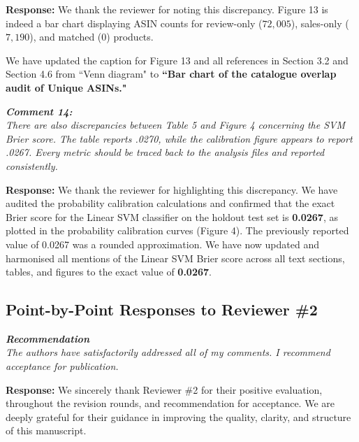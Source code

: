 \documentclass[11pt]{article}
\newcommand{\comment}[1]{\vspace{12pt}\noindent\colorbox{gray!10}{\parbox{\dimexpr\textwidth-2\fboxsep\relax}{\color{commentcolor}\itshape #1}}\vspace{6pt}}
\newcommand{\response}{\vspace{6pt}\noindent\textbf{Response: }}
\begin{document}
\response
We thank the reviewer for noting this discrepancy. Figure 13 is indeed a bar chart displaying ASIN counts for review-only ($72,005$), sales-only ($7,190$), and matched ($0$) products.

We have updated the caption for Figure 13 and all references in Section 3.2 and Section 4.6 from ``Venn diagram" to \textbf{``Bar chart of the catalogue overlap audit of Unique ASINs."}

\comment{\textbf{Comment 14:} \\
There are also discrepancies between Table 5 and Figure 4 concerning the SVM Brier score. The table reports .0270, while the calibration figure appears to report .0267. Every metric should be traced back to the analysis files and reported consistently.}

\response
We thank the reviewer for highlighting this discrepancy. We have audited the probability calibration calculations and confirmed that the exact Brier score for the Linear SVM classifier on the holdout test set is \textbf{0.0267}, as plotted in the probability calibration curves (Figure 4). The previously reported value of 0.0267 was a rounded approximation. We have now updated and harmonised all mentions of the Linear SVM Brier score across all text sections, tables, and figures to the exact value of \textbf{0.0267}.

\subsection*{Point-by-Point Responses to Reviewer \#2}

\comment{\textbf{Recommendation} \\
The authors have satisfactorily addressed all of my comments. I recommend acceptance for publication.}

\response
We sincerely thank Reviewer \#2 for their positive evaluation, throughout the revision rounds, and recommendation for acceptance. We are deeply grateful for their guidance in improving the quality, clarity, and structure of this manuscript.
\end{document}
